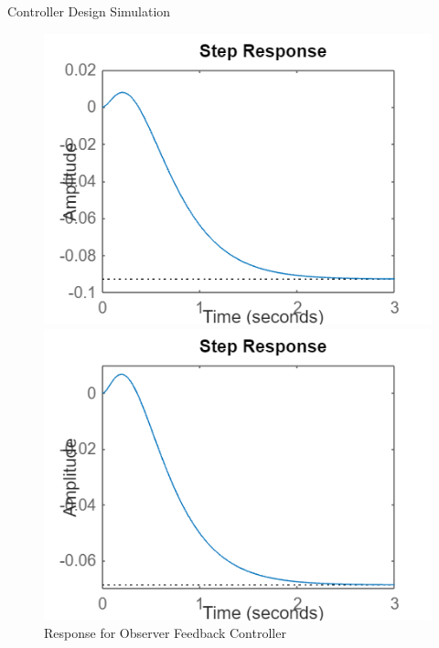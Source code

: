 \documentclass[10pt,compress,mathserif]{beamer}
\begin{document}
\begin{frame}{Controller Design Simulation}
\begin{figure}[h!]
    \centering
    \begin{minipage}{0.45\textwidth}
        \centering
        \includegraphics[width=\textwidth]{state_feedback.png}
        \caption{Response for State Feedback Controller}
    \end{minipage}
    \hfill
    \begin{minipage}{0.45\textwidth}
        \centering
        \includegraphics[width=\textwidth]{observer_feedback.png}
        \caption{Response for Observer Feedback Controller}
    \end{minipage}
\end{figure}
\end{frame}
\end{document}

